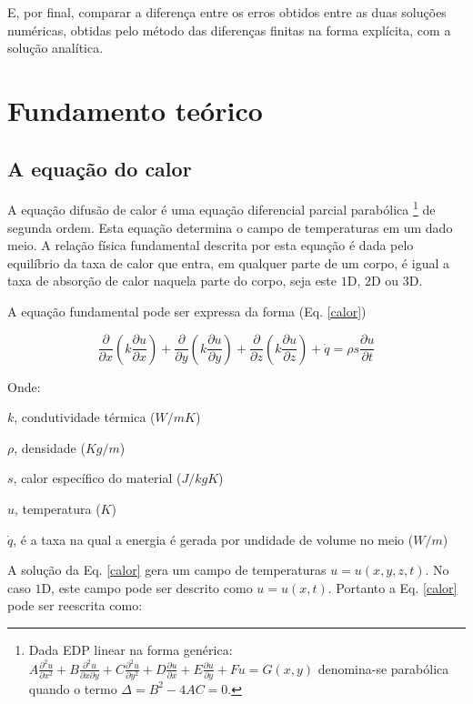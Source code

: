 \documentclass[12pt,a4paper,final]{report}%
\begin{document}
E, por final, comparar a diferença entre os erros obtidos entre as duas soluções numéricas, obtidas pelo método das diferenças finitas na forma explícita, com a solução analítica.


\section*{Fundamento teórico}
\subsection*{A equação do calor}

A equação difusão de calor é uma equação diferencial parcial parabólica \footnote{Dada EDP linear na forma genérica: $ A \frac{\partial^{2} u} {\partial x^{2}} + B \frac{\partial^{2} u }{\partial x \partial y} + C \frac{\partial^{2} u} {\partial y^{2}} + D \frac{\partial u}{\partial x} + E \frac{\partial u}{\partial y} + Fu = G(x,y)$ denomina-se parabólica quando o termo $\Delta=B^{2}-4 A C=0$.} de segunda ordem. Esta equação determina o campo de temperaturas em um dado meio. A relação física fundamental descrita por esta equação é dada pelo equilíbrio da taxa de calor que entra, em qualquer parte de um corpo, é igual a taxa de absorção de calor naquela parte do corpo, seja este $1$D, $2$D ou $3$D.

A equação fundamental pode ser expressa da forma (Eq. \ref{calor})

\begin{equation}
\frac{\partial}{\partial x} (k \frac{\partial u}{\partial x}) + \frac{\partial}{\partial y} (k \frac{\partial u}{\partial y}) + \frac{\partial}{\partial z} (k \frac{\partial u}{\partial z})+ \dot{q} = \rho s \frac{\partial u}{\partial t}
\label{calor}
\end{equation}

Onde:

$k$, condutividade térmica ($W/mK$)

$\rho$, densidade ($Kg/m$)

$s$, calor específico do material ($J/kg K$)

$u$, temperatura ($K$)

$\dot{q}$, é a taxa na qual a energia é gerada por undidade de volume no meio ($W/m$)


A solução da Eq. \ref{calor} gera um campo de temperaturas $u=u(x,y,z,t)$. No caso $1$D, este campo pode ser descrito como $u=u(x,t)$. Portanto a Eq. \ref{calor} pode ser reescrita como:
\end{document}

